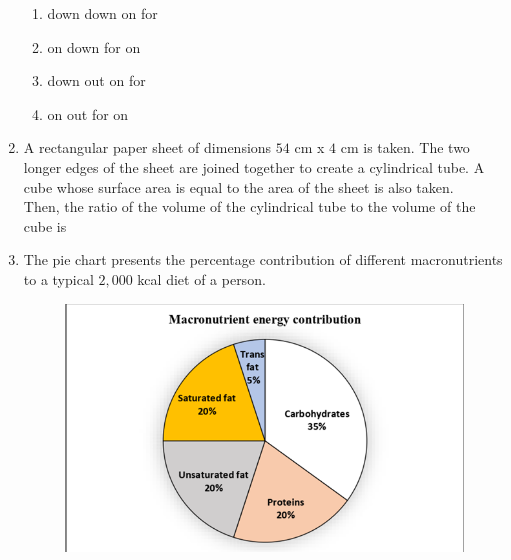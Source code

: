\documentclass[a4paper, 11pt]{article}
\begin{document}
\begin{enumerate}
    \begin{enumerate}
        \item {} down \quad {} down \quad {} on \quad {} for
        \item {} on \quad {} down \quad {} for \quad {} on
        \item {} down \quad {} out \quad {} on \quad {} for
        \item {} on \quad {} out \quad {} for \quad {} on
    \end{enumerate}
    \newpage
    \hfill{}
    
    \item A rectangular paper sheet of dimensions $54$ cm x $4$ cm is taken. The two longer edges of the sheet are joined together to create a cylindrical tube. A cube whose surface area is equal to the area of the sheet is also taken.\\
    Then, the ratio of the volume of the cylindrical tube to the volume of the cube is
    \begin{enumerate}
    \end{enumerate}
    \hfill{}
    
    \item The pie chart presents the percentage contribution of different macronutrients to a typical $2,000$ kcal diet of a person.
    
    \begin{figure}[H]
        \centering
        \includegraphics[width=0.6\columnwidth]{q8}
        \caption*{}
        \label{fig:q8}
    \end{figure}
    

\end{enumerate}
\end{document}
